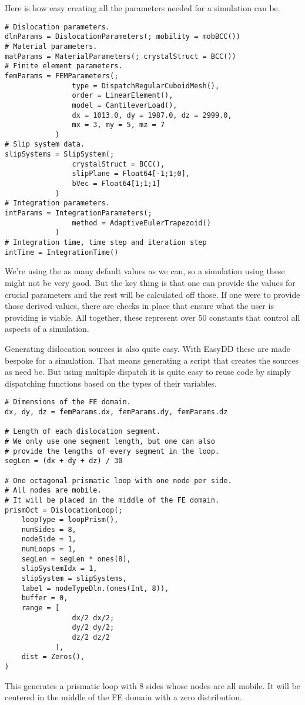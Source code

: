 Here is how easy creating all the parameters needed for a simulation can be.
\begin{verbatim}
# Dislocation parameters.
dlnParams = DislocationParameters(; mobility = mobBCC())
# Material parameters.
matParams = MaterialParameters(; crystalStruct = BCC())
# Finite element parameters.
femParams = FEMParameters(; 
                type = DispatchRegularCuboidMesh(), 
                order = LinearElement(), 
                model = CantileverLoad(), 
                dx = 1013.0, dy = 1987.0, dz = 2999.0,
                mx = 3, my = 5, mz = 7
            )
# Slip system data.
slipSystems = SlipSystem(; 
                crystalStruct = BCC(), 
                slipPlane = Float64[-1;1;0], 
                bVec = Float64[1;1;1]
            )
# Integration parameters.
intParams = IntegrationParameters(; 
                method = AdaptiveEulerTrapezoid()
            )
# Integration time, time step and iteration step
intTime = IntegrationTime()
\end{verbatim}
We're using the as many default values as we can, so a simulation using these might not be very good. But the key thing is that one can provide the values for crucial parameters and the rest will be calculated off those. If one were to provide those derived values, there are checks in place that ensure what the user is providing is viable. All together, these represent over 50 constants that control all aspects of a simulation.

Generating dislocation sources is also quite easy. With EasyDD these are made bespoke for a simulation. That means generating a script that creates the sources as need be. But using multiple dispatch it is quite easy to reuse code by simply dispatching functions based on the types of their variables.
\begin{verbatim}
# Dimensions of the FE domain.
dx, dy, dz = femParams.dx, femParams.dy, femParams.dz

# Length of each dislocation segment.
# We only use one segment length, but one can also 
# provide the lengths of every segment in the loop.
segLen = (dx + dy + dz) / 30

# One octagonal prismatic loop with one node per side.
# All nodes are mobile.
# It will be placed in the middle of the FE domain.
prismOct = DislocationLoop(;
    loopType = loopPrism(),
    numSides = 8,
    nodeSide = 1,
    numLoops = 1,
    segLen = segLen * ones(8),
    slipSystemIdx = 1,
    slipSystem = slipSystems,
    label = nodeTypeDln.(ones(Int, 8)),
    buffer = 0,
    range = [
                dx/2 dx/2; 
                dy/2 dy/2;
                dz/2 dz/2
            ],
    dist = Zeros(),
)
\end{verbatim}
This generates a prismatic loop with 8 sides whose nodes are all mobile. It will be centered in the middle of the FE domain with a zero distribution.

